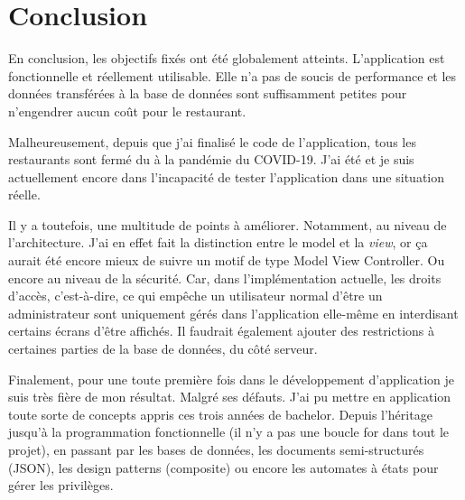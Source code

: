
\chapter{Conclusion}
En conclusion, les objectifs fixés ont été globalement atteints. L’application est fonctionnelle et réellement utilisable. Elle n’a pas de soucis de performance et les données transférées à la base de données sont suffisamment petites pour n’engendrer aucun coût pour le restaurant. 

Malheureusement, depuis que j’ai finalisé le code de l’application, tous les restaurants sont fermé du à la pandémie du COVID-19. J’ai été et je suis actuellement encore dans l’incapacité de tester l’application dans une situation réelle.

Il y a toutefois, une multitude de points à améliorer. Notamment, au niveau de l’architecture. J’ai en effet fait la distinction entre le model et la \textit{view}, or ça aurait été encore mieux de suivre un motif de type Model View Controller. Ou encore au niveau de la sécurité. Car, dans l’implémentation actuelle, les droits d’accès, c’est-à-dire, ce qui empêche un utilisateur normal d’être un administrateur sont uniquement gérés dans l’application elle-même en interdisant certains écrans d’être affichés. Il faudrait également ajouter des restrictions à certaines parties de la base de données, du côté serveur.

Finalement, pour une toute première fois dans le développement d’application je suis très fière de mon résultat. Malgré ses défauts. J’ai pu mettre en application toute sorte de concepts appris ces trois années de bachelor. Depuis l’héritage jusqu’à la programmation fonctionnelle (il n’y a pas une boucle for dans tout le projet), en passant par les bases de données, les documents semi-structurés (JSON), les design patterns (composite) ou encore les automates à états pour gérer les privilèges.